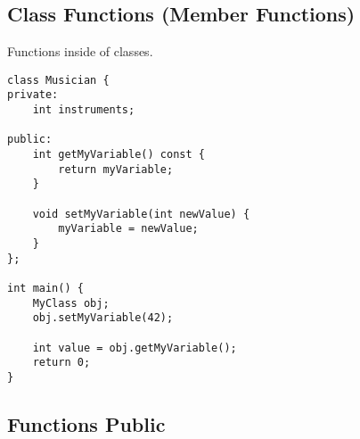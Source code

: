 \documentclass[openany]{report}
\begin{document}
\subsection{Class Functions (Member Functions)}

Functions inside of classes.

\begin{verbatim}
class Musician {
private:
    int instruments;

public:
    int getMyVariable() const {
        return myVariable;
    }

    void setMyVariable(int newValue) {
        myVariable = newValue;
    }
};

int main() {
    MyClass obj;
    obj.setMyVariable(42);

    int value = obj.getMyVariable();
    return 0;
}
\end{verbatim}

\subsection{Functions Public}
\end{document}
